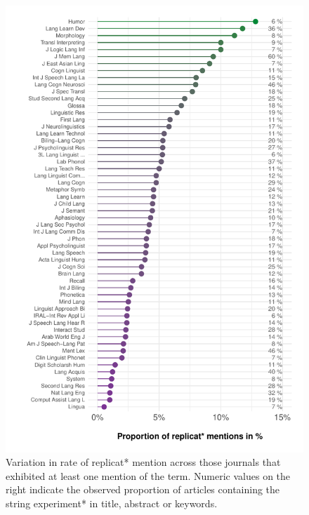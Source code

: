 \documentclass[cm,linguex]{glossa}
\begin{document}
\begin{figure}

{\centering \includegraphics{ReplicationLing_files/figure-latex/topten-plot-1} 

}

\caption{Variation in rate of replicat* mention across those journals that exhibited at least one mention of the term. Numeric values on the right indicate the observed proportion of articles containing the string experiment* in title, abstract or keywords.}\label{fig:topten-plot}
\end{figure}
\end{document}
